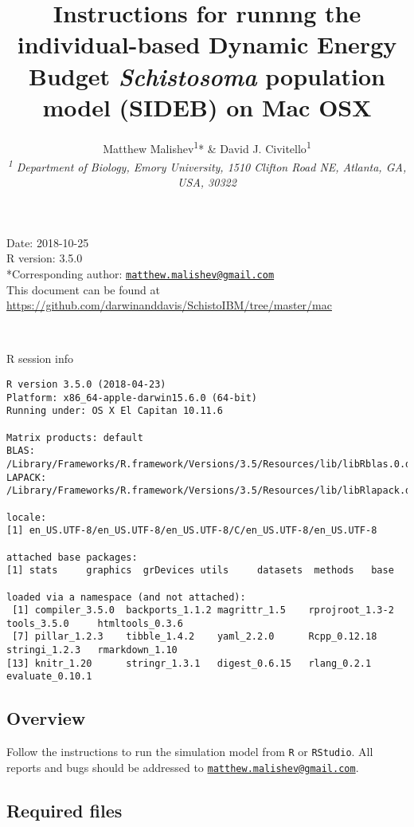 \documentclass[10,portrait]{article}
\title{Instructions for runnng the individual-based Dynamic Energy Budget
\emph{Schistosoma} population model (SIDEB) on Mac OSX}
\author{Matthew Malishev\textsuperscript{1}* \& David J.
Civitello\textsuperscript{1}\\[2\baselineskip]\emph{\textsuperscript{1}
Department of Biology, Emory University, 1510 Clifton Road NE, Atlanta,
GA, USA, 30322}}
\date{}
\begin{document}
\maketitle

{
\hypersetup{linkcolor=black}
\setcounter{tocdepth}{4}
\tableofcontents
}
\newpage   

Date: 2018-10-25\\
R version: 3.5.0\\
*Corresponding author:
\href{mailto:matthew.malishev@gmail.com}{\nolinkurl{matthew.malishev@gmail.com}}\\
This document can be found at
\url{https://github.com/darwinanddavis/SchistoIBM/tree/master/mac}

~

R session info

\begin{verbatim}
R version 3.5.0 (2018-04-23)
Platform: x86_64-apple-darwin15.6.0 (64-bit)
Running under: OS X El Capitan 10.11.6

Matrix products: default
BLAS: /Library/Frameworks/R.framework/Versions/3.5/Resources/lib/libRblas.0.dylib
LAPACK: /Library/Frameworks/R.framework/Versions/3.5/Resources/lib/libRlapack.dylib

locale:
[1] en_US.UTF-8/en_US.UTF-8/en_US.UTF-8/C/en_US.UTF-8/en_US.UTF-8

attached base packages:
[1] stats     graphics  grDevices utils     datasets  methods   base     

loaded via a namespace (and not attached):
 [1] compiler_3.5.0  backports_1.1.2 magrittr_1.5    rprojroot_1.3-2 tools_3.5.0     htmltools_0.3.6
 [7] pillar_1.2.3    tibble_1.4.2    yaml_2.2.0      Rcpp_0.12.18    stringi_1.2.3   rmarkdown_1.10 
[13] knitr_1.20      stringr_1.3.1   digest_0.6.15   rlang_0.2.1     evaluate_0.10.1
\end{verbatim}

\newpage  

\subsection{Overview}\label{overview}

Follow the instructions to run the simulation model from \texttt{R} or
\texttt{RStudio}. All reports and bugs should be addressed to
\href{mailto:matthew.malishev@gmail.com}{\nolinkurl{matthew.malishev@gmail.com}}.

\subsection{Required files}\label{required-files}
\end{document}
